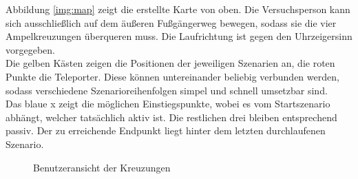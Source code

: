 \documentclass{Bericht}
\begin{document}
Abbildung \ref{img:map} zeigt die erstellte Karte von oben. 
Die Versuchsperson kann sich ausschließlich auf dem äußeren Fußgängerweg bewegen, sodass sie die vier Ampelkreuzungen überqueren muss. Die Laufrichtung ist gegen den Uhrzeigersinn vorgegeben.\\
Die gelben Kästen zeigen die Positionen der jeweiligen Szenarien an, die roten Punkte die Teleporter. Diese können untereinander beliebig verbunden werden, sodass verschiedene Szenarioreihenfolgen simpel und schnell umsetzbar sind.\\
Das blaue x zeigt die möglichen Einstiegspunkte, wobei es vom Startszenario abhängt, welcher tatsächlich aktiv ist. Die restlichen drei bleiben entsprechend passiv. Der zu erreichende Endpunkt liegt hinter dem letzten durchlaufenen Szenario. 

\begin{figure}[H]



	\caption{Benutzeransicht der Kreuzungen}
	
\end{figure}
\end{document}
